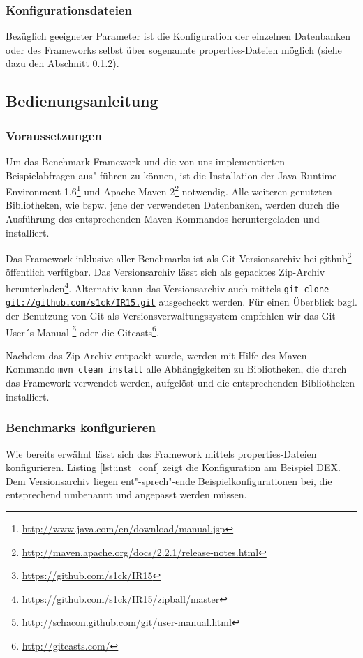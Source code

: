 \documentclass[11pt, a4paper, oneside]{article} %
\begin{document}
\subsubsection{Konfigurationsdateien}
Bezüglich geeigneter Parameter ist die Konfiguration der einzelnen Datenbanken oder des Frameworks selbst über sogenannte properties-Dateien möglich (siehe dazu den Abschnitt \ref{subsubsec:benchmarks_conf}).

\subsection{Bedienungsanleitung}
\label{subsec:bedienungsanleitung}

\subsubsection{Voraussetzungen}
Um das Benchmark-Framework und die von uns implementierten Beispielabfragen aus"-führen zu können, ist die Installation der Java Runtime Environment 1.6\footnote{\url{http://www.java.com/en/download/manual.jsp}} und Apache Maven 2\footnote{\url{http://maven.apache.org/docs/2.2.1/release-notes.html}} notwendig. Alle weiteren genutzten Bibliotheken, wie bspw. jene der verwendeten Datenbanken, werden durch die Ausführung des entsprechenden Maven-Kommandos heruntergeladen und installiert.

Das Framework inklusive aller Benchmarks ist als Git-Versionsarchiv bei github\footnote{\url{https://github.com/s1ck/IR15}} öffentlich verfügbar. Das Versionsarchiv lässt sich als gepacktes Zip-Archiv herunterladen\footnote{\url{https://github.com/s1ck/IR15/zipball/master}}. Alternativ kann das Versionsarchiv auch mittels \texttt{git clone \url{git://github.com/s1ck/IR15.git}} ausgecheckt werden. Für einen Überblick bzgl. der Benutzung von Git als Versionsverwaltungssystem empfehlen wir das Git User´s Manual 
\footnote{\url{http://schacon.github.com/git/user-manual.html}} oder die Gitcasts\footnote{\url{http://gitcasts.com/}}.

Nachdem das Zip-Archiv entpackt wurde, werden mit Hilfe des Maven-Kommando \texttt{mvn clean install} alle Abhängigkeiten zu Bibliotheken, die durch das Framework verwendet werden, aufgelöst und die entsprechenden Bibliotheken installiert.

\subsubsection{Benchmarks konfigurieren}
\label{subsubsec:benchmarks_conf}
Wie bereits erwähnt lässt sich das Framework mittels properties-Dateien konfigurieren. Listing \ref{lst:inst_conf} zeigt die Konfiguration am Beispiel DEX. Dem Versionsarchiv liegen ent"-sprech"-ende Beispielkonfigurationen bei, die entsprechend umbenannt und angepasst werden müssen. 
\end{document}

